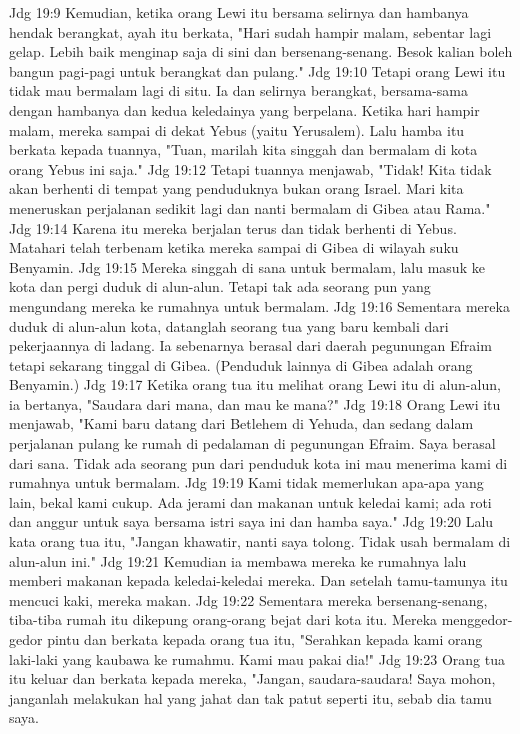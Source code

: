 Jdg 19:9  Kemudian, ketika orang Lewi itu bersama selirnya dan hambanya hendak berangkat, ayah itu berkata, "Hari sudah hampir malam, sebentar lagi gelap. Lebih baik menginap saja di sini dan bersenang-senang. Besok kalian boleh bangun pagi-pagi untuk berangkat dan pulang."
Jdg 19:10  Tetapi orang Lewi itu tidak mau bermalam lagi di situ. Ia dan selirnya berangkat, bersama-sama dengan hambanya dan kedua keledainya yang berpelana. Ketika hari hampir malam, mereka sampai di dekat Yebus (yaitu Yerusalem). Lalu hamba itu berkata kepada tuannya, "Tuan, marilah kita singgah dan bermalam di kota orang Yebus ini saja."
Jdg 19:12  Tetapi tuannya menjawab, "Tidak! Kita tidak akan berhenti di tempat yang penduduknya bukan orang Israel. Mari kita meneruskan perjalanan sedikit lagi dan nanti bermalam di Gibea atau Rama."
Jdg 19:14  Karena itu mereka berjalan terus dan tidak berhenti di Yebus. Matahari telah terbenam ketika mereka sampai di Gibea di wilayah suku Benyamin.
Jdg 19:15  Mereka singgah di sana untuk bermalam, lalu masuk ke kota dan pergi duduk di alun-alun. Tetapi tak ada seorang pun yang mengundang mereka ke rumahnya untuk bermalam.
Jdg 19:16  Sementara mereka duduk di alun-alun kota, datanglah seorang tua yang baru kembali dari pekerjaannya di ladang. Ia sebenarnya berasal dari daerah pegunungan Efraim tetapi sekarang tinggal di Gibea. (Penduduk lainnya di Gibea adalah orang Benyamin.)
Jdg 19:17  Ketika orang tua itu melihat orang Lewi itu di alun-alun, ia bertanya, "Saudara dari mana, dan mau ke mana?"
Jdg 19:18  Orang Lewi itu menjawab, "Kami baru datang dari Betlehem di Yehuda, dan sedang dalam perjalanan pulang ke rumah di pedalaman di pegunungan Efraim. Saya berasal dari sana. Tidak ada seorang pun dari penduduk kota ini mau menerima kami di rumahnya untuk bermalam.
Jdg 19:19  Kami tidak memerlukan apa-apa yang lain, bekal kami cukup. Ada jerami dan makanan untuk keledai kami; ada roti dan anggur untuk saya bersama istri saya ini dan hamba saya."
Jdg 19:20  Lalu kata orang tua itu, "Jangan khawatir, nanti saya tolong. Tidak usah bermalam di alun-alun ini."
Jdg 19:21  Kemudian ia membawa mereka ke rumahnya lalu memberi makanan kepada keledai-keledai mereka. Dan setelah tamu-tamunya itu mencuci kaki, mereka makan.
Jdg 19:22  Sementara mereka bersenang-senang, tiba-tiba rumah itu dikepung orang-orang bejat dari kota itu. Mereka menggedor-gedor pintu dan berkata kepada orang tua itu, "Serahkan kepada kami orang laki-laki yang kaubawa ke rumahmu. Kami mau pakai dia!"
Jdg 19:23  Orang tua itu keluar dan berkata kepada mereka, "Jangan, saudara-saudara! Saya mohon, janganlah melakukan hal yang jahat dan tak patut seperti itu, sebab dia tamu saya.
